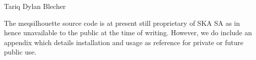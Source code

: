 Tariq Dylan Blecher
 \clearpage
  \vspace*{\fill}
    \begin{center}
     \huge
     The {\sc meqsilhouette} source code is at present still proprietary of SKA SA as in hence unavailable to the public at the time of writing. However, we do include an appendix which details installation and usage as reference for private or future public use.
    \end{center}
  \vspace*{\fill}
\tableofcontents
{}
\listoffigures
{}
\listoftables
{}
